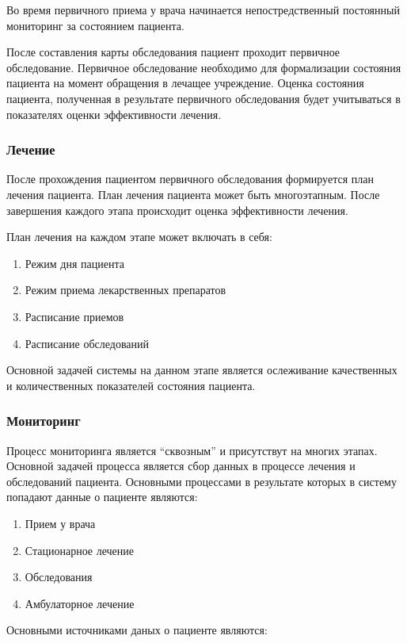 Во время первичного приема у врача начинается непостредственный постоянный
мониторинг за состоянием пациента.

После составления карты обследования пациент проходит первичное обследование.
Первичное обследование необходимо для формализации состояния пациента на момент
обращения в лечащее учреждение. Оценка состояния пациента, полученная в
результате первичного обследования будет учитываться в показателях оценки
эффективности лечения.

\subsubsection{Лечение}
После прохождения пациентом первичного обследования формируется план лечения
пациента. План лечения пациента может быть многоэтапным. После завершения
каждого этапа происходит оценка эффективности лечения.

План лечения на каждом этапе может включать в себя:

\begin{enumerate}
  \item Режим дня пациента
  \item Режим приема лекарственных препаратов
  \item Расписание приемов
  \item Расписание обследований    
\end{enumerate}

Основной задачей системы на данном этапе является ослеживание качественных и
количественных показателей состояния пациента.

\subsubsection{Мониторинг}
Процесс мониторинга является “сквозным” и присутствут на многих этапах. Основной
задачей процесса является сбор данных в процессе лечения и обследований
пациента.
Основными процессами в результате которых в систему попадают данные о пациенте
являются:

\begin{enumerate}
  \item Прием у врача
  \item Стационарное лечение
  \item Обследования
  \item Амбулаторное лечение 
\end{enumerate}

Основными источниками даных о пациенте являются:

